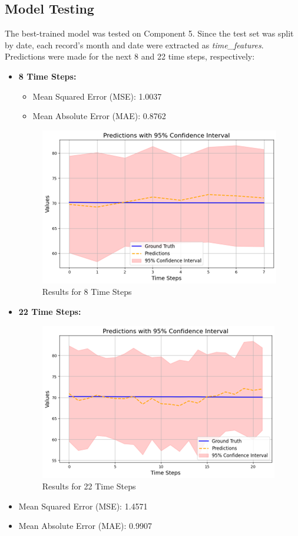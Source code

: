 \subsection{Model Testing}
\label{subsec:Testing}
The best-trained model was tested on Component 5. Since the test set was split by date, each record's month and date were extracted as \textit{time\_features}. Predictions were made for the next 8 and 22 time steps, respectively:
\begin{itemize}
	\item \textbf{8 Time Steps:}
		\begin{itemize}
		\item Mean Squared Error (MSE): 1.0037
		\item Mean Absolute Error (MAE): 0.8762
	\end{itemize}
	\begin{figure}[h!]
		\centering
		\includegraphics[width=0.8\linewidth]{figures/8times_before}
		\caption{Results for 8 Time Steps}
		\label{fig:8times_before}
	\end{figure}

\end{itemize}


\begin{itemize}
	\item \textbf{22 Time Steps:}
	\begin{figure}[h!]
		\centering
		\includegraphics[width=0.8\linewidth]{figures/22times_before}
		\caption{Results for 22 Time Steps}
		\label{fig:22times_before}
	\end{figure}

\end{itemize}
	\begin{itemize}
	\item Mean Squared Error (MSE): 1.4571
	\item Mean Absolute Error (MAE): 0.9907
\end{itemize}


